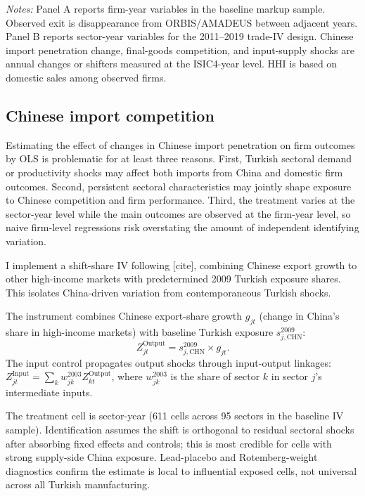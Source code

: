 \documentclass[12pt]{article}
\newcommand{\textcite}[2][]{[cite]}
\begin{document}
\begin{table}[!htbp]
\begin{threeparttable}
\begin{tablenotes}[flushleft]
\footnotesize
\item \textit{Notes:} Panel A reports firm-year variables in the baseline markup sample.
Observed exit is disappearance from ORBIS/AMADEUS between adjacent years.
Panel B reports sector-year variables for the 2011--2019 trade-IV design.
Chinese import penetration change, final-goods competition, and input-supply shocks are annual changes or shifters measured at the ISIC4-year level.
HHI is based on domestic sales among observed firms.
\end{tablenotes}

\end{threeparttable}
\end{table}

\subsection{Chinese import competition}
\label{sec:data_treatment}

Estimating the effect of changes in Chinese import penetration on firm outcomes by OLS is problematic for at least three reasons. First, Turkish sectoral demand or productivity shocks may affect both imports from China and domestic firm outcomes. Second, persistent sectoral characteristics may jointly shape exposure to Chinese competition and firm performance. Third, the treatment varies at the sector-year level while the main outcomes are observed at the firm-year level, so naive firm-level regressions risk overstating the amount of independent identifying variation.

I implement a shift-share IV following \textcite{autorTradeAdjustmentWorkerLevel2014}, combining Chinese export growth to other high-income markets with predetermined 2009 Turkish exposure shares. This isolates China-driven variation from contemporaneous Turkish shocks.

The instrument combines Chinese export-share growth $g_{jt}$ (change in China's share in high-income markets) with baseline Turkish exposure $s_{j,\text{CHN}}^{2009}$:
\[
Z_{jt}^{\text{Output}} = s_{j,\text{CHN}}^{2009} \times g_{jt}.
\]
The input control propagates output shocks through input-output linkages: $Z_{jt}^{\text{Input}} = \sum_k w_{jk}^{2003} Z_{kt}^{\text{Output}}$, where $w_{jk}^{2003}$ is the share of sector $k$ in sector $j$'s intermediate inputs.

The treatment cell is sector-year (611 cells across 95 sectors in the baseline IV sample). Identification assumes the shift is orthogonal to residual sectoral shocks after absorbing fixed effects and controls; this is most credible for cells with strong supply-side China exposure. Lead-placebo and Rotemberg-weight diagnostics confirm the estimate is local to influential exposed cells, not universal across all Turkish manufacturing.
\end{document}
